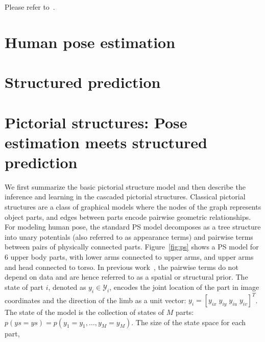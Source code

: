 Please refer to~\citet{sapp2010cascades}.

\chapter{Human pose estimation}

\chapter{Structured prediction}

\chapter{Pictorial structures: Pose estimation meets structured prediction}
We first summarize the basic pictorial structure model and then
describe the inference and learning in the cascaded pictorial structures.
Classical pictorial structures are a class of graphical models where the nodes of the graph represents object parts, and edges between parts encode pairwise geometric relationships.  For modeling human pose, the standard PS model decomposes as a tree structure into unary potentials (also referred to as appearance terms) and pairwise terms between pairs of physically connected parts.  Figure~\ref{fig:ps} shows a PS model for 6 upper body parts, with lower arms connected to upper arms, and upper arms and head connected to torso.  In previous work~\cite{devacrf,felz05,ferrari08,posesearch,andriluka09}, the pairwise terms do not depend on data and are hence referred to as a spatial or structural prior.
The state of part $i$, denoted as $y_i \in \mathcal{Y}_i$, encodes the joint 
location of the part in image coordinates and the direction of the limb as a 
unit vector: $y_i = [y_{ix} \; y_{iy} \; y_{iu} \; y_{iv}]^T$. The state of the 
model is the collection of states of $M$ parts: $p(ys = ys) = p(y_1 = y_1, 
\ldots, y_M = y_M)$.  The size of the state space for each part, 

